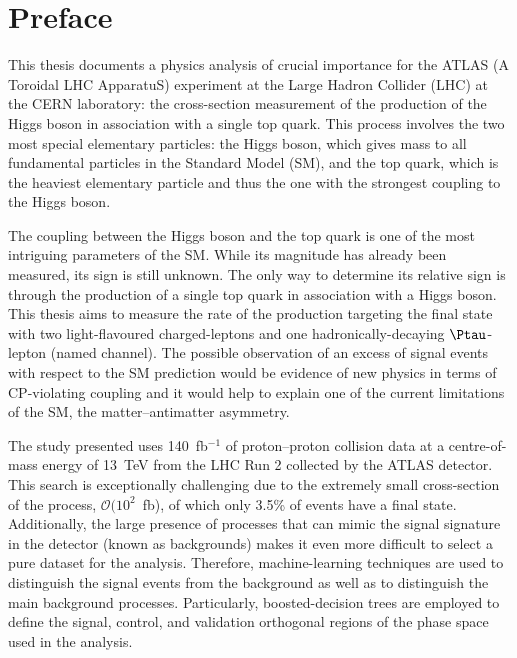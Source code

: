 \chapter*{Preface}

This thesis documents a physics analysis of crucial importance for the ATLAS (A Toroidal LHC ApparatuS) experiment at the Large Hadron
Collider (LHC) at the CERN laboratory: the cross-section measurement of the production of the Higgs boson in association with a single top
quark. This process involves the two most special elementary particles: the Higgs boson, which gives mass to all fundamental particles in
the Standard Model (SM), and the top quark, which is the heaviest elementary particle and thus the one with the strongest coupling to the Higgs
boson.

The coupling between the Higgs boson and the top quark is one of the most intriguing parameters of the SM. While its magnitude has already been measured, its sign is still unknown. The only way to determine its relative sign is through the production of a single top quark in association with a Higgs boson. This thesis aims to measure the rate of the \tHq production targeting the final state with two light-flavoured charged-leptons 
and one hadronically-decaying $\Ptau$-lepton (named \dileptau channel).
The possible observation of an excess of signal events with respect to the SM prediction would be evidence of new physics in terms of CP-violating coupling and it would help to explain one of the current limitations of the SM, the matter--antimatter asymmetry. 

The study presented uses 140~fb$^{-1}$ of proton--proton collision data at a centre-of-mass energy 
of 13~TeV from the LHC Run 2 collected by the ATLAS detector. 
This search is exceptionally challenging due to the extremely small cross-section of the \tHq process, $\mathcal{O}(10^2$~fb), of
which only 3.5\% of events have a \dileptau final state. Additionally, the large presence of processes that can mimic the signal
signature in the detector (known as backgrounds) makes it even more difficult to select a pure dataset for the analysis. 
Therefore, machine-learning techniques are used to distinguish the \tHq 
signal events from the background as well as to distinguish the main background processes. 
Particularly, boosted-decision trees are employed to define the signal, control, and validation orthogonal regions of 
the phase space used in the analysis. 

